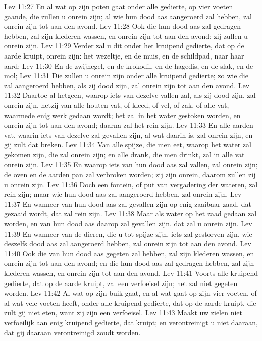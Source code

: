 Lev 11:27  En al wat op zijn poten gaat onder alle gedierte, op vier voeten gaande, die zullen u onrein zijn; al wie hun dood aas aangeroerd zal hebben, zal onrein zijn tot aan den avond.
Lev 11:28  Ook die hun dood aas zal gedragen hebben, zal zijn klederen wassen, en onrein zijn tot aan den avond; zij zullen u onrein zijn.
Lev 11:29  Verder zal u dit onder het kruipend gedierte, dat op de aarde kruipt, onrein zijn: het wezeltje, en de muis, en de schildpad, naar haar aard;
Lev 11:30  En de zwijnegel, en de krokodil, en de hagedis, en de slak, en de mol;
Lev 11:31  Die zullen u onrein zijn onder alle kruipend gedierte; zo wie die zal aangeroerd hebben, als zij dood zijn, zal onrein zijn tot aan den avond.
Lev 11:32  Daartoe al hetgeen, waarop iets van dezelve vallen zal, als zij dood zijn, zal onrein zijn, hetzij van alle houten vat, of kleed, of vel, of zak, of alle vat, waarmede enig werk gedaan wordt; het zal in het water gestoken worden, en onrein zijn tot aan den avond; daarna zal het rein zijn.
Lev 11:33  En alle aarden vat, waarin iets van dezelve zal gevallen zijn, al wat daarin is, zal onrein zijn, en gij zult dat breken.
Lev 11:34  Van alle spijze, die men eet, waarop het water zal gekomen zijn, die zal onrein zijn; en alle drank, die men drinkt, zal in alle vat onrein zijn.
Lev 11:35  En waarop iets van hun dood aas zal vallen, zal onrein zijn; de oven en de aarden pan zal verbroken worden; zij zijn onrein, daarom zullen zij u onrein zijn.
Lev 11:36  Doch een fontein, of put van vergadering der wateren, zal rein zijn; maar wie hun dood aas zal aangeroerd hebben, zal onrein zijn.
Lev 11:37  En wanneer van hun dood aas zal gevallen zijn op enig zaaibaar zaad, dat gezaaid wordt, dat zal rein zijn.
Lev 11:38  Maar als water op het zaad gedaan zal worden, en van hun dood aas daarop zal gevallen zijn, dat zal u onrein zijn.
Lev 11:39  En wanneer van de dieren, die u tot spijze zijn, iets zal gestorven zijn, wie deszelfs dood aas zal aangeroerd hebben, zal onrein zijn tot aan den avond.
Lev 11:40  Ook die van hun dood aas gegeten zal hebben, zal zijn klederen wassen, en onrein zijn tot aan den avond; en die hun dood aas zal gedragen hebben, zal zijn klederen wassen, en onrein zijn tot aan den avond.
Lev 11:41  Voorts alle kruipend gedierte, dat op de aarde kruipt, zal een verfoeisel zijn; het zal niet gegeten worden.
Lev 11:42  Al wat op zijn buik gaat, en al wat gaat op zijn vier voeten, of al wat vele voeten heeft, onder alle kruipend gedierte, dat op de aarde kruipt, die zult gij niet eten, want zij zijn een verfoeisel.
Lev 11:43  Maakt uw zielen niet verfoeilijk aan enig kruipend gedierte, dat kruipt; en verontreinigt u niet daaraan, dat gij daaraan verontreinigd zoudt worden.
